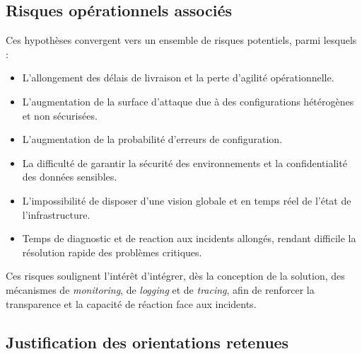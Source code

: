 \subsection{Risques opérationnels associés}

Ces hypothèses convergent vers un ensemble de risques potentiels, parmi lesquels :
\begin{itemize}
	\item L'allongement des délais de livraison et la perte d'agilité opérationnelle.
	\item L'augmentation de la surface d'attaque due à des configurations hétérogènes et non sécurisées.
	\item L'augmentation de la probabilité d'erreurs de configuration.
	\item La difficulté de garantir la sécurité des environnements et la confidentialité des données sensibles.
	\item L'impossibilité de disposer d'une vision globale et en temps réel de l'état de l'infrastructure.
	\item Temps de diagnostic et de reaction aux incidents allongés, rendant difficile la résolution rapide des problèmes critiques.
\end{itemize}

Ces risques soulignent l'intérêt d'intégrer, dès la conception de la solution, des mécanismes de \emph{monitoring}, de \emph{logging} et de \emph{tracing}, afin de renforcer la transparence et la capacité de réaction face aux incidents.

\subsection{Justification des orientations retenues}

